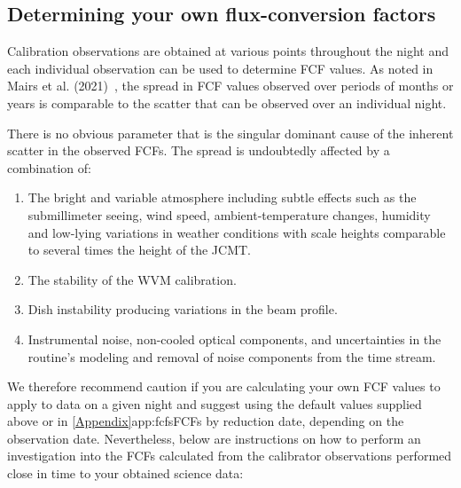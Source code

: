 \subsection{Determining your own flux-conversion factors}
\label{sec:own_fcf}

Calibration observations are obtained at various points throughout the
night and each individual observation can be used to determine FCF values.
As noted in Mairs et al. (2021)~\cite{mairs21}, the spread in FCF values observed
over periods of months or years is comparable to the scatter that can be observed
over an individual night.

There is no obvious parameter that is the singular dominant cause of the inherent scatter
in the observed FCFs. The spread is undoubtedly affected by a combination of:

\begin{enumerate}

\item The bright and variable atmosphere including subtle effects such as the
submillimeter seeing, wind speed, ambient-temperature changes, humidity and low-lying variations
in weather conditions with scale heights comparable to several times the height of the JCMT.

\item The stability of the WVM calibration.

\item Dish instability producing variations in the beam profile.

\item Instrumental noise, non-cooled optical components, and uncertainties in the {} routine's
modeling and removal of noise components from the time stream.

\end{enumerate}

We therefore recommend caution if you are calculating your own FCF
values to apply to data on a given night and suggest using the default values
supplied above or in \cref{Appendix}{app:fcfs}{FCFs by reduction date}, depending on the observation date.
Nevertheless, below are instructions on how to perform an investigation into
the FCFs calculated from the calibrator observations performed close in time
to your obtained science data:

